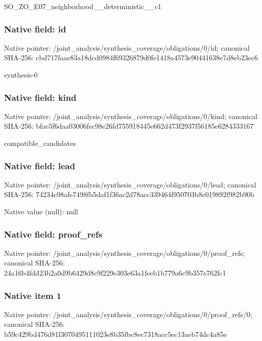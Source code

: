 \documentclass[10pt,a4paper]{article}
\begin{document}
\begingroup\raggedright\sloppy SO\_\allowbreak{}ZO\_\allowbreak{}E07\_\allowbreak{}neighborhood\_\allowbreak{}\_\allowbreak{}deterministic\_\allowbreak{}\_\allowbreak{}c1\par\endgroup

\subsubsection{Native field: id}
Native pointer: /joint\_\allowbreak{}analysis/synthesis\_\allowbreak{}coverage/obligations/0/id; canonical SHA-256: cbd717faae83a18dcd0984f69326879d0fe1418a4573e90441638e7d8eb23ec6

\begingroup\raggedright\sloppy synthesis-0\par\endgroup

\subsubsection{Native field: kind}
Native pointer: /joint\_\allowbreak{}analysis/synthesis\_\allowbreak{}coverage/obligations/0/kind; canonical SHA-256: bfae5f6daa03006fec98e26fd755918445e662d473f2937f56185e6284333167

\begingroup\raggedright\sloppy compatible\_\allowbreak{}candidates\par\endgroup

\subsubsection{Native field: lead}
Native pointer: /joint\_\allowbreak{}analysis/synthesis\_\allowbreak{}coverage/obligations/0/lead; canonical SHA-256: 74234e98afe7498fb5daf1f36ac2d78acc339464f950703b8c019892f982b90b

Native value (null): null

\subsubsection{Native field: proof\_\allowbreak{}refs}
Native pointer: /joint\_\allowbreak{}analysis/synthesis\_\allowbreak{}coverage/obligations/0/proof\_\allowbreak{}refs; canonical SHA-256: 24a16b4fdd23b2a0d9b6429d8c9f229e303e63a1feeb1b779a6c9b357e762fc1

\subsubsection{Native item 1}
Native pointer: /joint\_\allowbreak{}analysis/synthesis\_\allowbreak{}coverage/obligations/0/proof\_\allowbreak{}refs/0; canonical SHA-256: b59c429bd476d81f3070495111023e8b35fbc8ec7318acc5ec13aeb74dc4a85e
\end{document}
